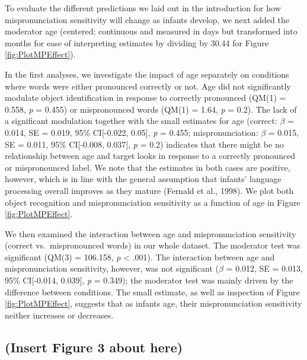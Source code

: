\documentclass[man]{apa6}
\begin{document}
To evaluate the different predictions we laid out in the introduction for how mispronunciation sensitivity will change as infants develop, we next added the moderator age (centered; continuous and measured in days but transformed into months for ease of interpreting estimates by dividing by 30.44 for Figure \ref{fig:PlotMPEffect}).

In the first analyses, we investigate the impact of age separately on conditions where words were either pronounced correctly or not. Age did not significantly modulate object identification in response to correctly pronounced (QM(1) = 0.558, \emph{p} = 0.455) or mispronounced words (QM(1) = 1.64, \emph{p} = 0.2). The lack of a significant modulation together with the small estimates for age (correct: \(\beta\) = 0.014, SE = 0.019, 95\% CI{[}-0.022, 0.05{]}, \emph{p} = 0.455; mispronunciation: \(\beta\) = 0.015, SE = 0.011, 95\% CI{[}-0.008, 0.037{]}, \emph{p} = 0.2) indicates that there might be no relationship between age and target looks in response to a correctly pronounced or mispronounced label. We note that the estimates in both cases are positive, however, which is in line with the general assumption that infants' language processing overall improves as they mature (Fernald et al., 1998). We plot both object recognition and mispronunciation sensitivity as a function of age in Figure \ref{fig:PlotMPEffect}.

We then examined the interaction between age and mispronunciation sensitivity (correct vs.~mispronounced words) in our whole dataset. The moderator test was significant (QM(3) = 106.158, \emph{p} \textless{} .001). The interaction between age and mispronunciation sensitivity, however, was not significant (\(\beta\) = 0.012, SE = 0.013, 95\% CI{[}-0.014, 0.039{]}, \emph{p} = 0.349); the moderator test was mainly driven by the difference between conditions. The small estimate, as well as inspection of Figure \ref{fig:PlotMPEffect}, suggests that as infants age, their mispronunciation sensitivity neither increases or decreases.

\hypertarget{insert-figure-3-about-here}{%
\subsection{(Insert Figure 3 about here)}\label{insert-figure-3-about-here}}
\end{document}
